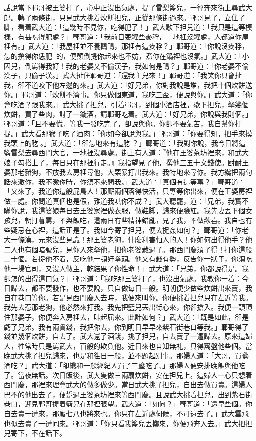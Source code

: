 話說當下鄆哥被王婆打了，心中正沒出氣處，提了雪梨籃兒，一徑奔來街上尋武大郎。轉了兩條街，只見武大挑着炊餅担兒，正從那條街過來。鄆哥見了，立住了脚，看着武大道：「這幾時不見你，吃得肥了！」武大歇下担兒道：「我只是這等模樣，有甚吃得肥處？」鄆哥道：「我前日要糴些麥稃，一地裡沒糴處，人都道你屋裡有。」武大道：「我屋裡並不養鵝鴨，那裡有這麥稃？」鄆哥道：「你說沒麥稃，怎的撰得你恁肥𦞂𦞂的，便顛倒提你起來也不妨，煮你在鍋裡也沒氣。」{}武大道：「小囚兒，倒罵得我好！我的老婆又不偷漢子，{}我如何是鴨？」鄆哥道：「你老婆不偷漢子，只偷子漢。」武大扯住鄆哥道：「還我主兒來！」鄆哥道：「我笑你只會扯我，卻不道咬下他左邊的來。」武大道：「好兄弟，你對我說是誰，我把十個炊餅送你。」鄆哥道：「炊餅不濟事。你只做個東道，我吃三盃，便說與你。」武大道：「你會吃酒？跟我來。」武大挑了担兒，引着鄆哥，到個小酒店裡，歇下担兒，拏幾個炊餅，買了些肉，討了一鏇酒，請鄆哥吃着。武大道：「好兄弟，你說與我則個。」鄆哥道：「且不要慌，等我一發吃完了，卻說與你。你卻不要氣苦，我自幫你打捉。」武大看那猴子吃了酒肉：「你如今卻說與我。」鄆哥道：「你要得知，把手來摸我頭上的肐𦞂。」武大道：「卻怎地來有這肐𦞂？」鄆哥道：「我對你說，我今日將這籃雪梨去尋西門大官，一地裡沒尋處。街上有人道：『他在王婆茶坊裡來，和武大娘子勾搭上了，每日只在那裡行走。』我指望見了他，撰他三五十文錢使。尀耐王婆那老豬狗，不放我去房裡尋他，大栗暴打出我來。我特地來尋你。我方纔把兩句話來激你，我不激你時，你須不來問我。」武大道：「真個有這等事？」鄆哥道：「又來了，我道你這般屁鳥人！那厮兩個落得快活，只專等你出來，便在王婆房裡做一處。你問道真個也是假，難道我哄你不成？」武大聽罷，道：「兄弟，我實不瞞你說，我這婆娘每日去王婆家裡做衣服，做鞋脚，歸來便臉紅。我先妻丟下個女孩兒，朝打暮罵，不與飯吃，這兩日有些精神錯亂，見了我，不做歡喜。我自也有些疑忌在心裡，這話正是了。我如今寄了担兒，便去捉姦如何？」鄆哥道：「你老大一條漢，元來沒些見識！那王婆老狗，什麼利害怕人的人！你如何出得他手？他二人也有個暗號兒，見你入來拏他，把你老婆藏過了。那西門慶須了得！打你這般二十個。若捉他不着，反吃他一頓好拳頭。他又有錢有勢，反告你一狀子，你須吃他一場官司，又沒人做主，乾結果了你性命！」{}武大道：「兄弟，你都說得是。我卻怎的出得這口氣？」鄆哥道：「我吃那王婆打了，也沒出氣處。我教你一着：今日歸去，都不要發作，也不要說，只自做每日一般。明朝便少做些炊餅出來賣，我自在巷口等你。若是見西門慶入去時，我便來叫你。你便挑着担兒只在左近等我。我先去惹那老狗，他必然來打我。我先把籃兒丟出街心來，你卻搶入。我便一頭頂住那婆子，你便奔入房裡去，叫起屈來。此計如何？」武大道：「既是如此，卻是虧了兄弟。我有兩貫錢，我把你去，你到明日早早來紫石街巷口等我。」鄆哥得了錢並幾個炊餅，自去了。武大還了酒錢，挑了担兒，自去賣了一遭歸去。原來這婦人，徃常時只是罵武大，百般的欺負他。近日來也自知無礼，只得窩盤他些個。{}當晚武大挑了担兒歸來，也是和徃日一般，並不題起別事。那婦人道：「大哥，買盞酒吃？」武大道：「卻纔和一般經紀人買了三盞吃了。」那婦人便安排晚飯與他吃了。當夜無話。次日飯後，武大隻做三兩扇炊餅，安在担兒上。這婦人一心只想着西門慶，那裡來理會武大的做多做少。當日武大挑了担兒，自出去做買賣。這婦人巴不的他出去了，便踅過王婆茶坊裡來等西門慶。且說武大挑着担兒，出到紫石街巷口，迎見鄆哥提着籃兒在那裡張望。{}武大道：「如何？」鄆哥道：「還早些個。你自去賣一遭來，那厮七八也將來也。你只在左近處伺候，不可遠去了。」武大雲飛也似去賣了一遭囘來。鄆哥道：「你只看我籃兒丟擲來，你便飛奔入去。」武大把担兒寄下，不在話下。

